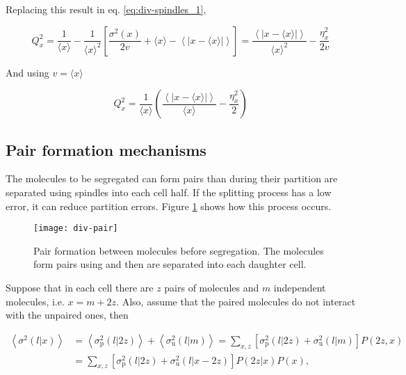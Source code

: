 Replacing this result in eq. \eqref{eq:div-spindles_1},

\begin{equation*}
  Q_x^2 = \frac{1}{\langle x\rangle}-\frac{1}{\langle x\rangle^2}\left[\frac{\sigma^2(x)}{2v}+\langle x\rangle-\left\langle\left|x-\langle x\rangle\right|\right\rangle\right] = \frac{\left\langle\left|x-\langle x\rangle\right|\right\rangle}{\langle x\rangle^2}-\frac{\eta_x^2}{2v}
\end{equation*}

And using $v=\langle x\rangle$

\begin{equation*}
  Q_x^2 = \frac{1}{\langle x\rangle}\left(\frac{\left\langle\left|x-\langle x\rangle\right|\right\rangle}{\langle x\rangle}-\frac{\eta_x^2}{2}\right)
\end{equation*}

\subsection{Pair formation mechanisms}

The molecules to be segregated can form pairs than during their partition are separated using spindles into each cell half. If the splitting process has a low error, it can reduce partition errors. Figure \ref{fig:div-pair} shows how this process occurs.

\begin{figure}[H]
  \centering
  \texttt{[image: div-pair]}
  \caption[Pair formation between molecules before segregation]{\label{fig:div-pair}Pair formation between molecules before segregation. The molecules form pairs using and then are separated into each daughter cell.}
\end{figure}

Suppose that in each cell there are $z$ pairs of molecules and $m$ independent molecules, i.e. $x=m+2z$. Also, assume that the paired molecules do not interact with the unpaired ones, then

\begin{equation}
  \label{eq:div-pu}
  \begin{split}
    \left\langle\sigma^2(l|x)\right\rangle &= \left\langle\sigma^2_\text{p}(l|2z)\right\rangle + \left\langle\sigma^2_\text{u}(l|m)\right\rangle = \sum_{x,z}\left[\sigma^2_\text{p}(l|2z) + \sigma^2_\text{u}(l|m)\right]P(2z,x)\\
    &= \sum_{x,z}\left[\sigma^2_\text{p}(l|2z) + \sigma^2_\text{u}(l|x-2z)\right]P(2z|x)P(x),
  \end{split}
\end{equation}

